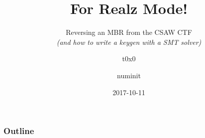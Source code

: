 \documentclass[aspectratio=169]{beamer}
\title{For Realz Mode!}
\subtitle{
    Reversing an MBR from the CSAW CTF\\
    {\em (and how to write a keygen with a SMT solver)}
}
\author{t0x0 \and numinit}
\institute{DC858, DC619, and \VaporSec}
\date{2017-10-11}
\begin{document}
\begin{frame}
    \titlepage
\end{frame}

\begin{frame}
    \frametitle{Outline}
    \tableofcontents[]
\end{frame}





\end{document}
